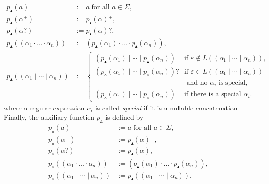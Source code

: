 \documentclass[a4paper,11pt, svgnames,titlepage]{article}
\newcommand{\rxp}{{^\mathtt{+}}}
\newcommand{\rxo}{\mathtt{?}}
\newcommand{\rxc}{\cdot}
\DeclareMathOperator{\ror}{\mathtt{|}}
\newcommand{\emptyword}{\varepsilon}
\newcommand{\df}{:=}
\newcommand{\pnfupfun}{p_{\blacktriangle}}
\newcommand{\pnfuphfun}{p_{\vartriangle}}
\newcommand{\pnfup}[1]{\pnfupfun{\left(#1\right)}}
\newcommand{\pnfuph}[1]{\pnfuphfun{\left(#1\right)}}
\begin{document}
\begin{align*}
	\pnfup{a}&\df a \text{ for all $a\in \Sigma$},\\
	\pnfup{\alpha\rxp}
		&\df \pnfup{\alpha}\rxp,\\
	\pnfup{\alpha\rxo}
		&\df \pnfup{\alpha}\rxo,\\
	\pnfup{(\alpha_1\rxc \ldots \rxc \alpha_n)}
		&\df (\pnfup{\alpha_1}\rxc \ldots \rxc \pnfup{\alpha_n}),\\
	\pnfup{(\alpha_1\ror \cdots \ror \alpha_n)}
		&\df \begin{cases}
			(\pnfup{\alpha_1}\ror \cdots \ror \pnfup{\alpha_n}) & \text{if $\emptyword\notin L((\alpha_1\ror \cdots \ror \alpha_n))$},\\
			(\pnfuph{\alpha_1}\ror \cdots \ror \pnfuph{\alpha_n})\rxo & \text{if $\emptyword\in L((\alpha_1\ror \cdots \ror \alpha_n))$}\\
			& \text{ and no $\alpha_i$ is special},\\
			(\pnfuph{\alpha_1}\ror \cdots \ror \pnfuph{\alpha_n})& \text{if there is a special $\alpha_i$}.
		\end{cases}
\end{align*}
where a regular expression $\alpha_i$ is called \emph{special} if it is a nullable concatenation.
Finally, the auxiliary function $\pnfuphfun$ is defined by
\begin{align*}
	\pnfuph{a}&\df a \text{ for all $a\in \Sigma$},\\
	\pnfuph{\alpha\rxp}
		&\df \pnfup{\alpha}\rxp,\\
	\pnfuph{\alpha\rxo}
		&\df \pnfup{\alpha},\\
	\pnfuph{(\alpha_1\rxc \ldots \rxc \alpha_n)}
		&\df (\pnfup{\alpha_1}\rxc \ldots \rxc \pnfup{\alpha_n}),\\
	\pnfuph{(\alpha_1\ror \cdots \ror \alpha_n)}
		&\df \pnfup{(\alpha_1\ror \cdots \ror \alpha_n)}.
\end{align*}
\end{document}
